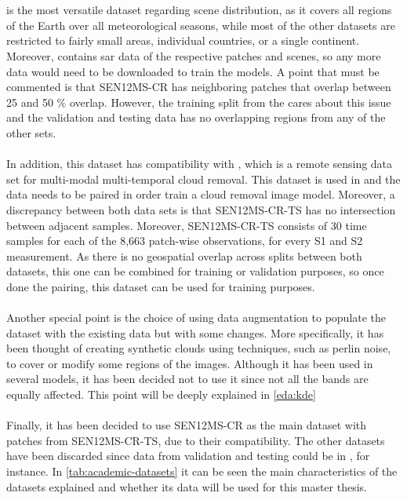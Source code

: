 \documentclass[../main.tex]{subfiles}
\begin{document}
\\
\\
\cite{sen12mscr} is the most versatile dataset regarding scene distribution, as it covers all regions of the Earth over all meteorological seasons, while most of the other datasets are restricted to fairly small areas, individual countries, or a single continent. Moreover, \cite{sen12mscr} contains \gls{sar} data of the respective patches and scenes, so any more data would need to be downloaded to train the models. A point that must be commented is that SEN12MS-CR has neighboring patches that overlap between 25
and 50 \% overlap. However, the training split from the \cite{sen12mscr} cares about this issue and the validation and testing data has no overlapping regions from any of the other sets.
\\
\\
In addition, this dataset has compatibility with \cite{sen12mscrts}, which is a remote sensing data set for multi-modal multi-temporal cloud removal. This dataset is used in \cite{uncrtaints2021ebel} and the data needs to be paired in order train a cloud removal image model. Moreover, a discrepancy
between both data sets is that SEN12MS-CR-TS has no intersection
between adjacent samples. 
Moreover, SEN12MS-CR-TS consists of 30 time samples for each of
the 8,663 patch-wise observations, for every S1 and S2
measurement.
As there is no geospatial overlap across splits between both datasets, this one can be combined for training or validation purposes, so once done the pairing, this dataset can be used for training purposes.
\\
\\
Another special point is the choice of using data augmentation to populate the dataset with the existing data but with some changes. More specifically, it has been thought of creating synthetic clouds using techniques, such as perlin noise, to cover or modify some regions of the images. Although it has been used in several models, it has been decided not to use it since not all the bands are equally affected. This point will be deeply explained in \ref{eda:kde}
\\
\\
Finally, it has been decided to use SEN12MS-CR as the main dataset with patches from SEN12MS-CR-TS, due to their compatibility. The other datasets have been discarded since data from validation and testing could be in \cite{sarukkai2019cloud}, for instance. In \ref{tab:academic-datasets} it can be seen the main characteristics of the datasets explained and whether its data will be used for this master thesis.
\end{document}
